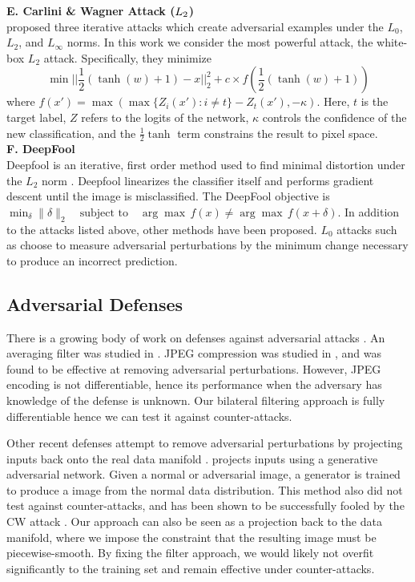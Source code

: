 \documentclass{article} %
\begin{document}
\noindent \textbf{E. Carlini \& Wagner Attack ($\normalfont{L_2}$)} \\
\citep{carlini2017towards} proposed three iterative attacks which create adversarial examples under the $L_0$, $L_2$, and $L_\infty$ norms. In this work we consider the most powerful attack, the white-box $L_2$ attack. Specifically, they minimize
\[\min \vert \vert \frac{1}{2}(\tanh(w) + 1)- x \vert \vert^{2}_{2} + c \times f (\frac{1}{2}(\tanh(w)+1))\] 
where $f(x') = \max(\max\{Z_i(x') : i \neq t\}- Z_t(x'), -\kappa)$.
Here, $t$ is the target label, $Z$ refers to the logits of the network, $\kappa$ controls the confidence of the new classification, and the $\frac{1}{2}\tanh$ term constrains the result to pixel space.
\\

\noindent \textbf{F. DeepFool}\\
Deepfool is an iterative, first order method used to find minimal distortion under the $L_2$ norm \citep{moosavi2016deepfool}. Deepfool linearizes the classifier itself and performs gradient descent until the image is misclassified. The DeepFool objective is  $ \min_{\delta} \|\delta\|_2 \quad \textrm{subject to}\quad \arg\max \, f(x) \neq \arg\max \, f(x + \delta)$.
In addition to the attacks listed above, other methods have been proposed. $L_0$ attacks such as \citep{papernot2016limitations} choose to measure adversarial perturbations by the minimum change necessary to produce an incorrect prediction.
\\

\subsection{Adversarial Defenses}
There is a growing body of work on defenses against adversarial attacks \citep{papernot2016effectiveness,papernot2015distillation,xu2017feature,liao2018defense}. An averaging filter was studied in \citep{li2017adversarial}. JPEG compression was studied in \citep{dziugaite2016study,das2017keeping}, and was found to be effective at removing adversarial perturbations. However, JPEG encoding is not differentiable, hence its performance when the adversary has knowledge of the defense is unknown. Our bilateral filtering approach is fully differentiable hence we can test it against counter-attacks.

Other recent defenses attempt to remove adversarial perturbations by projecting inputs back onto the real data manifold \citep{meng2017magnet}. \citep{shen2017ape} projects inputs using a generative adversarial network. Given a normal or adversarial image, a generator is trained to produce a image from the normal data distribution. This method also did not test against counter-attacks, and has been shown to be successfully fooled by the CW attack \citep{meng2017magnet}. Our approach can also be seen as a projection back to the data manifold, where we impose the constraint that the resulting image must be piecewise-smooth. By fixing the filter approach, we would likely not overfit significantly to the training set and remain effective under counter-attacks. %
 
\end{document}
